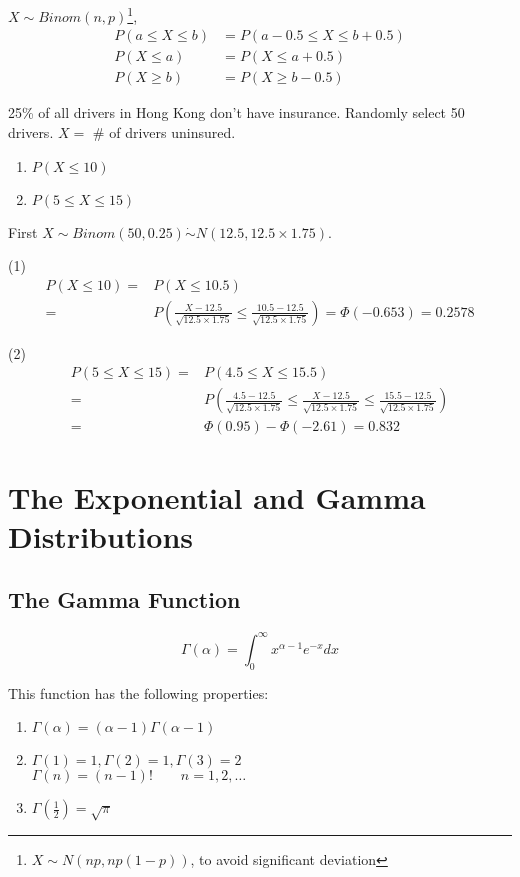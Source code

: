 $X \sim Binom(n,p)$\footnote{$X \sim N(np,np(1-p))$, to avoid significant deviation},
\begin{align*}
P(a \leq X \leq b)&=P(a-0.5 \leq X \leq b+0.5)  \\
P(X \leq a) &= P(X \leq a+0.5)	\\
P(X \geq b) &= P(X \geq b-0.5)
\end{align*}

\begin{exmp}
25\% of all drivers in Hong Kong don't have insurance. Randomly select 50 drivers. $X=$ \# of drivers uninsured.

\begin{enumerate}
\item $P(X \leq 10)$
\item $P(5 \leq X \leq 15)$ 
\end{enumerate}

First $X\sim Binom(50,0.25) \dot{\sim} N(12.5,12.5\times1.75)$.

(1) \begin{align*}
P(X\leq 10) =& P(X \leq 10.5) \\
=& P\left( \frac{X-12.5}{\sqrt{12.5\times1.75}}  \leq   \frac{10.5-12.5}{\sqrt{12.5\times1.75}}\right)=\Phi(-0.653)=0.2578
\end{align*}

(2) \begin{align*}
P(5 \leq X\leq 15) =& P(4.5 \leq X \leq 15.5) \\
=& P\left(\frac{4.5-12.5}{\sqrt{12.5\times1.75}} \leq \frac{X-12.5}{\sqrt{12.5\times1.75}}  \leq   \frac{15.5-12.5}{\sqrt{12.5\times1.75}}\right)	\\
=&\Phi(0.95)-\Phi(-2.61)=0.832
\end{align*}
\end{exmp}

\section{The Exponential and Gamma Distributions}
\subsection{The Gamma Function}
\begin{defn}
\[\Gamma(\alpha)=\int_0^{\infty} x^{\alpha-1}e^{-x} dx\]
\end{defn}

This function has the following properties:
\begin{enumerate}
\item $\Gamma(\alpha)=(\alpha-1)\Gamma(\alpha-1)$
\item $\Gamma(1)=1,\Gamma(2)=1,\Gamma(3)=2$\\
$\Gamma(n)=(n-1)! \qquad n=1,2,\dots$
\item $\Gamma(\frac{1}{2})=\sqrt{\pi}$
\end{enumerate}

